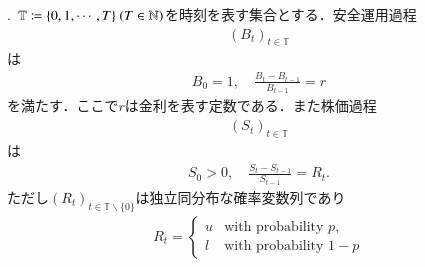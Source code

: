\begin{comment}
		&= \int_{\Omega} \defunc_{(R_t = u)} Z(\omega)\, \prob{d\omega} \\
		&= \int_{\Omega} \defunc_{(R_t = u)} Z_t(\omega)\, \prob{d\omega}\ \prod_{s \neq t} \int_{\Omega} Z_s(\omega)\, \prob{d\omega} \\
		&= \frac{q}{p}\prob{R_t = u} \\
		&= q
	\end{align}
	が成り立つ．同様にして$\operatorname{Q}(R_t = l) = 1-q$も成立する．つまり$\operatorname{Q}$は
	前命題の条件(2)を満たし，その同値条件により資産過程は確率測度$\operatorname{Q}$の下でリスク中立的となる．
	最後に$\operatorname{Q}$が$\operatorname{P}$と同値であることを示す．命題の仮定により
	$0 < p,q$であるから，全ての$\omega \in \Omega$について
	\begin{align}
		0 < m \coloneqq \min{}{\left\{\tfrac{q}{p}, \tfrac{1-q}{1-p}\right\}}
		\leq Z_t(\omega) \leq \max{}{\left\{\tfrac{q}{p}, \tfrac{1-q}{1-p}\right\}} \eqqcolon M
	\end{align}
	が成り立っている．従って$\operatorname{P}(A) > 0$なる$A \in \mathscr{F}$に対しては
	\begin{align}
		m^T \operatorname{P}(A) \leq \operatorname{Q}(A) \leq M^T \operatorname{P}(A)
	\end{align}
	が成り立つから，$\operatorname{Q}$と$\operatorname{P}$が同値であることが示された．
	\QED
\end{prf}
\end{comment}
.\ $\mathbb{T} \coloneqq \{0, 1, \cdots,T\}\ (T \in \N)$を時刻を表す集合とする．安全運用過程
\begin{align}
	(B_t)_{t \in \mathbb{T}}
\end{align}
は
\begin{align}
	B_0 = 1, \quad \frac{B_t - B_{t-1}}{B_{t-1}} = r
\end{align}
を満たす．ここで$r$は金利を表す定数である．また株価過程
\begin{align}
	(S_t)_{t \in \mathbb{T}}
\end{align}
は
\begin{align}
	S_0 > 0, \quad \frac{S_t - S_{t-1}}{S_{t-1}} = R_t.
\end{align}
ただし$(R_t)_{t \in \mathbb{T}\backslash \{0\}}$は独立同分布な確率変数列であり
\begin{align}
	R_t = \begin{cases}
		u & \mbox{with probability } p, \\
		l & \mbox{with probability } 1-p
	\end{cases}
\end{align}
